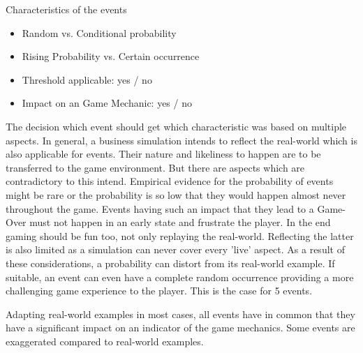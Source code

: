\documentclass[11pt,titlepage,oneside,openany]{book}
\begin{document}
Characteristics of the events
\begin{itemize}
\item Random vs. Conditional probability
\item Rising Probability vs. Certain occurrence
\item Threshold applicable: yes / no
\item Impact on an Game Mechanic: yes / no
\end{itemize}
The decision which event should get which characteristic was based on multiple aspects. In general, a business simulation intends to reflect the real-world which is also applicable for events. Their nature and likeliness to happen are to be transferred to the game environment. But there are aspects which are contradictory to this intend. Empirical evidence for the probability of events might be rare or the probability is so low that they would happen almost never throughout the game. Events having such an impact that they lead to a Game-Over must not happen in an early state and frustrate the player. In the end gaming should be fun too, not only replaying the real-world. Reflecting the latter is also limited as a simulation can never cover every 'live' aspect. As a result of these considerations, a probability can distort from its real-world example. If suitable, an event can even have a complete random occurrence providing a more challenging game experience to the player. This is the case for 5 events. 



Adapting real-world examples in most cases, all events have in common that they have a significant impact on an indicator of the game mechanics. Some events are exaggerated compared to real-world examples. 
\end{document}
